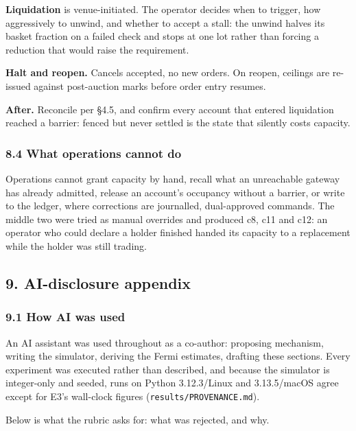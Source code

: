\documentclass[10pt,a4paper]{article}
\begin{document}
\textbf{Liquidation} is venue-initiated. The operator decides when to trigger, how
aggressively to unwind, and whether to accept a stall: the unwind halves its
basket fraction on a failed check and stops at one lot rather than forcing a
reduction that would raise the requirement.

\textbf{Halt and reopen.} Cancels accepted, no new orders. On reopen, ceilings are
re-issued against post-auction marks before order entry resumes.

\textbf{After.} Reconcile per §4.5, and confirm every account that entered liquidation
reached a barrier: fenced but never settled is the state that silently costs
capacity.

\subsubsection{8.4 What operations cannot do}\label{what-operations-cannot-do}

Operations cannot grant capacity by hand, recall what an unreachable gateway has
already admitted, release an account's occupancy without a barrier, or write to
the ledger, where corrections are journalled, dual-approved commands. The middle
two were tried as manual overrides and produced c8, c11 and c12: an operator who
could declare a holder finished handed its capacity to a replacement while the
holder was still trading.



\clearpage

\label{start:10}%

\subsection{9. AI-disclosure appendix}\label{ai-disclosure-appendix}

\subsubsection{9.1 How AI was used}\label{how-ai-was-used}

An AI assistant was used throughout as a co-author: proposing mechanism, writing
the simulator, deriving the Fermi estimates, drafting these sections. Every
experiment was executed rather than described, and because the simulator is
integer-only and seeded, runs on Python 3.12.3/Linux and 3.13.5/macOS agree
except for E3's wall-clock figures (\texttt{results/PROVENANCE.md}).

Below is what the rubric asks for: what was rejected, and why.
\end{document}

